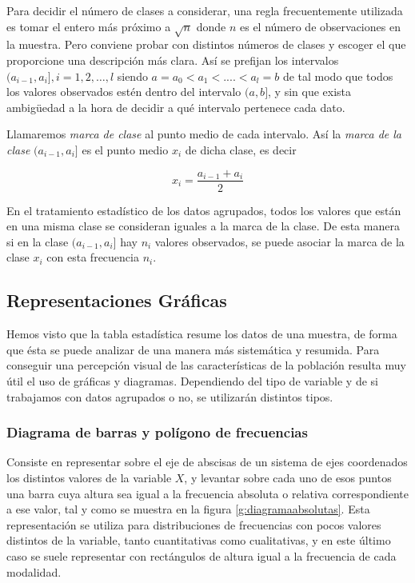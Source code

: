 Para decidir el número de clases a considerar, una regla frecuentemente utilizada es tomar el entero más próximo a
$\sqrt{n}$ donde $n$ es el número de observaciones en la muestra. Pero conviene probar con distintos números de clases y
escoger el que proporcione una descripción más clara. Así se prefijan los intervalos $(a_{i-1},a_i] , i=1,2,\ldots,l$
siendo $a=a_0<a_1<....<a_l=b$ de tal modo que todos los valores observados estén dentro del intervalo $(a, b]$, y sin
que exista ambig\"{u}edad a la hora de decidir a qué intervalo pertenece cada dato.

Llamaremos \emph{marca de clase} al punto medio de cada intervalo.
Así la \emph{marca de la clase} $(a_{i-1},a_i]$ es el punto medio $x_i$ de dicha clase, es decir

\[  x_i=\frac{a_{i-1}+a_i}{2} \]

En el tratamiento estadístico de los datos agrupados, todos los valores que están en una misma clase se consideran
iguales a la marca de la clase. De esta manera si en la clase $(a_{i-1},a_i]$ hay $n_i$ valores observados, se puede
asociar la marca de la clase $x_i$ con esta frecuencia $n_i$.



\subsection{Representaciones Gráficas}
Hemos visto que la tabla estadística resume los datos de una muestra, de forma que ésta se puede analizar de una manera
más sistemática y resumida. Para conseguir una percepción visual de las carac\-terísticas de la población resulta muy
útil el uso de gráficas y diagramas. Dependiendo del tipo de variable y de si trabajamos con datos agrupados o no, se
utilizarán distintos tipos.


\subsubsection{Diagrama de barras y polígono de frecuencias}
Consiste en representar sobre el eje de abscisas de un sistema de ejes coordenados los distintos valores de la variable
$X$, y levantar sobre cada uno de esos puntos una barra cuya altura sea igual a la frecuencia absoluta o relativa
correspondiente a ese valor, tal y como se muestra en la figura \ref{g:diagramaabsolutas}.
Esta representación se utiliza para distribuciones de frecuencias con pocos valores distintos de la variable, tanto
cuantitativas como cualitativas, y en este último caso se suele representar con rectángulos de altura igual a la
frecuencia de cada modalidad.

